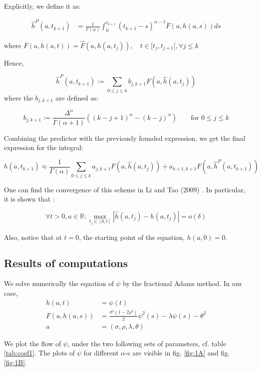 Explicitly, we define it as:

\begin{align*}
\hat{h}^P ( a, t_{k+1} ) &= \frac 1 { \Gamma(\alpha)} \int_0^{t_{k+1}} (t_{k+1}-s)^{\alpha - 1} \overline{F} ( a, h(a,s) ) ds
\end{align*}

where $ \overline{F} ( a, h(a,t) ) = \hat{F} ( a, h(a,t_j) ), \quad t\in [t_j, t_{j+1}[, \forall j \leq k $

Hence,

$$\hat{h}^P ( a, t_{k+1} ) := \sum_{0 \leq j \leq k } b_{j,k+1} F( a, \hat{h} ( a,t_j ) )  $$
where the $b_{j,k+1}$ are defined as:

$$ b_{j,k+1} := \frac{\Delta^{\alpha}} { \Gamma( \alpha +1 ) } \left ( (k-j+1)^{\alpha} - (k-j)^{\alpha} \right ) \qquad  \mbox{for } 0 \leq j \leq k $$

Combining the predictor with the previously founded expression, we get the final expression for the integral:

$$h(a,t_{k+1} ) \approx \frac 1 { \Gamma(\alpha)} \sum_{0 \leq j \leq k } a_{j,k+1} F( a, \hat{h} ( a,t_j ) )  + a_{k+1, k+1}  F( a, \hat{h}^P ( a,t_{k+1} ) )$$

One can find the convergence of this scheme in Li and Tao (2009) \cite{convergence_psi}. In particular, it is shown that :

$$\forall t> 0, a \in \mathbb R \colon \max_{t_j \in [0,t]} | \hat{h}(a,t_j) - h(a,t_j)| = o(\delta) $$

Also, notice that at $t = 0$, the starting point of the equation, $h(a,0 ) = 0$.




\subsection{Results of computations}
\label{SDES}
We solve numerically the equation of $\psi$ by the fractional Adams method. In our case, 
\begin{align*}
h(a,t) &= \psi ( t ) \\
F ( a, h(a,s) ) &= \frac{\sigma^2 ( 1 - 2 \rho^2 ) }{2} \psi^2 ( s) - \lambda \psi (s) - \theta^2 \\
a &= (\sigma, \rho, \lambda, \theta)
\end{align*}



We plot the flow of $\psi$, under the two following sets of parameters, cf. table \ref{tab:coef1}. The plots of $\psi$ for different $\alpha$-s are visible in fig. \ref{fig:1A} and fig. \ref{fig:1B}.

